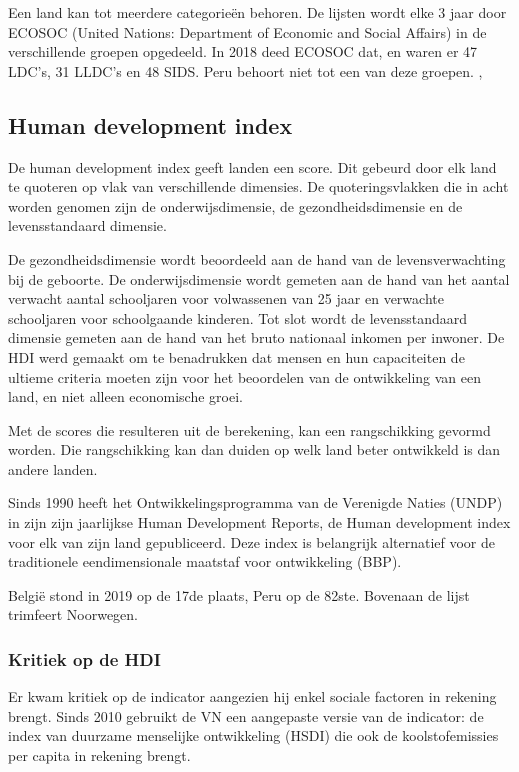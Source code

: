 Een land kan tot meerdere categorieën behoren. De lijsten wordt elke 3 jaar door ECOSOC (United Nations: Department of Economic and Social Affairs)  in de verschillende groepen opgedeeld. In 2018 deed ECOSOC dat, en waren er 47 LDC's, 31 LLDC's en 48 SIDS. Peru behoort niet tot een van deze groepen. \autocite{MarcJ.Bossuyt2005},

\subsection{Human development index}
De human development index geeft landen een score. Dit gebeurd door elk land te quoteren op vlak van verschillende dimensies. De quoteringsvlakken die in acht worden genomen zijn de onderwijsdimensie, de gezondheidsdimensie en de levensstandaard dimensie.

De gezondheidsdimensie wordt beoordeeld aan de hand van de levensverwachting bij de geboorte. De onderwijsdimensie wordt gemeten aan de hand van het aantal verwacht aantal schooljaren voor volwassenen van 25 jaar en verwachte schooljaren voor schoolgaande kinderen. Tot slot wordt de levensstandaard dimensie gemeten aan de hand van het bruto nationaal inkomen per inwoner. De HDI werd gemaakt om te benadrukken dat mensen en hun capaciteiten de ultieme criteria moeten zijn voor het beoordelen van de ontwikkeling van een land, en niet alleen economische groei. \autocite{UNDP2019}

Met de scores die resulteren uit de berekening, kan een rangschikking gevormd worden. Die rangschikking kan dan duiden op welk land beter ontwikkeld is dan andere landen. 

Sinds 1990 heeft het Ontwikkelingsprogramma van de Verenigde Naties (UNDP) in zijn zijn jaarlijkse Human Development Reports, de Human development index voor elk van zijn land gepubliceerd. \autocite{AmbujD.Sagar1997} Deze index is belangrijk alternatief voor de traditionele eendimensionale maatstaf voor ontwikkeling (BBP). 

België stond in 2019 op de 17de plaats, Peru op de 82ste. Bovenaan de lijst trimfeert Noorwegen. \autocite{UNDP2019a} 

\subsubsection{Kritiek op de HDI}
Er kwam kritiek op de indicator aangezien hij enkel sociale factoren in rekening brengt. Sinds 2010 gebruikt de VN een aangepaste versie van de indicator: de index van duurzame menselijke ontwikkeling (HSDI) die ook de koolstofemissies per capita in rekening brengt. \autocite{Economie2018}

